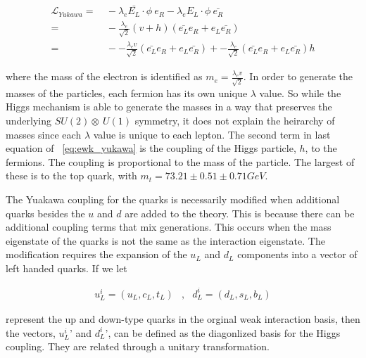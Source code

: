 \begin{equation}\label{eq:ewk_yukawa}
\begin{aligned}
\mathcal{L}_{Yukawa} =&~ -\lambda_{e}\bar{E_{L}}\cdot\phi~e_{R} -
\lambda_{e}E_{L}\cdot\phi~\bar{e_{R}} \\
=&~ -\frac{\lambda_{e}}{\sqrt{2}}(v+h)(\bar{e_{L}}e_{R} +
  e_{L}\bar{e_{R}}) \\
=&~ --\frac{\lambda_{e}v}{\sqrt{2}}(\bar{e_{L}}e_{R} +
  e_{L}\bar{e_{R}}) + -\frac{\lambda_{e}}{\sqrt{2}}(\bar{e_{L}}e_{R} +
  e_{L}\bar{e_{R}})h
\end{aligned}
\end{equation}

\noindent where the mass of the electron is identified as $m_{e} =
\frac{\lambda_{e}v}{\sqrt{2}}$.  In order to generate the masses of
the particles, each fermion has its own unique $\lambda$ value.  So
while the Higgs mechanism is able to generate the masses in a way that
preserves the underlying $SU(2)\otimes~U(1)$ symmetry, it does not
explain the heirarchy of masses since each $\lambda$ value is unique
to each lepton.  The second term in last equation of
~\ref{eq:ewk_yukawa} is the coupling of the Higgs particle, $h$, to
the fermions.  The coupling is proportional to the mass of the
particle.  The largest of these is to the top quark, with $m_{t} =
73.21 \pm 0.51 \pm 0.71 GeV$.

\par The Yuakawa coupling for the quarks is necessarily modified when
additional quarks besides the $u$ and $d$ are added to the theory.
This is because there can be additional coupling terms that mix
generations.  This occurs when the mass eigenstate of the quarks is
not the same as the interaction eigenstate.  The modification requires
the expansion of the $u_{L}$ and $d_{L}$ components into a vector of
left handed quarks.  If we let

\begin{equation}\label{eq:ewk_quark_vector}
\begin{aligned}
u_{L}^{i} = (u_{L}, c_{L}, t_{L}) &,                 & d_{L}^{i} = (d_{L}, s_{L}, b_{L})
\end{aligned}
\end{equation}

\noindent represent the up and down-type quarks in the orginal weak
interaction basis, then the vectors, $u_{L}^{i}$' and $d_{L}^{i}$',
can be defined as the diagonlized basis for the Higgs coupling.  They
are related through a unitary transformation.  


